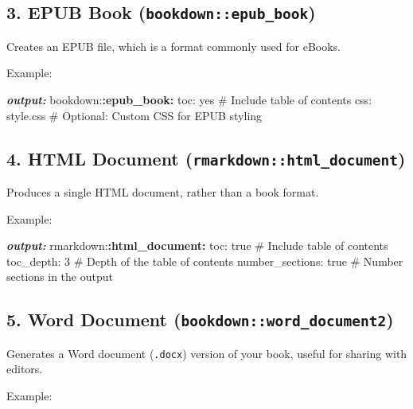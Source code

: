 \documentclass[
]{book}
\newenvironment{Shaded}{\begin{snugshade}}{\end{snugshade}}
\newcommand{\AnnotationTok}[1]{\textcolor[rgb]{0.56,0.35,0.01}{\textbf{\textit{#1}}}}
\newcommand{\NormalTok}[1]{#1}
\newcommand{\SpecialCharTok}[1]{\textcolor[rgb]{0.81,0.36,0.00}{\textbf{#1}}}
\theoremstyle{definition}
\theoremstyle{definition}
\theoremstyle{definition}
\theoremstyle{definition}
\theoremstyle{remark}
\begin{document}
\subsection{\texorpdfstring{3. EPUB Book (\texttt{bookdown::epub\_book})}{3. EPUB Book (bookdown::epub\_book)}}\label{epub-book-bookdownepub_book}

Creates an EPUB file, which is a format commonly used for eBooks.

Example:

\begin{Shaded}
\begin{Highlighting}[]
\AnnotationTok{output:}
\NormalTok{  bookdown:}\SpecialCharTok{:epub\_book:}
\NormalTok{    toc: yes  \# Include table of contents}
\NormalTok{    css: style.css  \# Optional: Custom CSS for EPUB styling}
\end{Highlighting}
\end{Shaded}

\subsection{\texorpdfstring{4. HTML Document (\texttt{rmarkdown::html\_document})}{4. HTML Document (rmarkdown::html\_document)}}\label{html-document-rmarkdownhtml_document}

Produces a single HTML document, rather than a book format.

Example:

\begin{Shaded}
\begin{Highlighting}[]
\AnnotationTok{output:}
\NormalTok{  rmarkdown:}\SpecialCharTok{:html\_document:}
\NormalTok{    toc: true  \# Include table of contents}
\NormalTok{    toc\_depth: 3  \# Depth of the table of contents}
\NormalTok{    number\_sections: true  \# Number sections in the output}
\end{Highlighting}
\end{Shaded}

\subsection{\texorpdfstring{5. Word Document (\texttt{bookdown::word\_document2})}{5. Word Document (bookdown::word\_document2)}}\label{word-document-bookdownword_document2}

Generates a Word document (\texttt{.docx}) version of your book, useful for sharing with editors.

Example:
\end{document}
